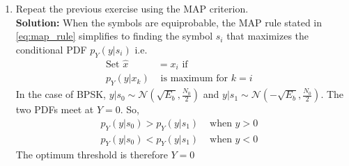 \documentclass[journal,10pt,twocolumn]{IEEEtran}
\newcommand{\solution}{\noindent \textbf{Solution: }}
\providecommand{\dec}[2]{\ensuremath{\overset{#1}{\underset{#2}{\gtrless}}}}
\providecommand{\gauss}[2]{\mathcal{N}\ensuremath{\left(#1,#2\right)}}
\begin{document}
\begin{enumerate}
\solution The decision rule is
\begin{equation}
y \dec{s_0}{s_1} 0
\end{equation}
\item
Repeat the previous exercise using the MAP criterion.\\
\solution When the symbols are equiprobable, the MAP rule stated in \eqref{eq:map_rule} simplifies to finding the symbol $s_i$ that %
maximizes the conditional PDF $p_Y(y|s_i)$ i.e.
\begin{align}
	\label{eq:mle_rule}
	\text{Set } \hat{x} &= x_i \text{ if}&\\ \nonumber
	p_Y(y|x_k) &\text{ is maximum for } k = i
\end{align}
In the case of BPSK, $y|s_0 \sim \gauss{\sqrt{E_b}}{\frac{N_0}{2}}$ and $y|s_1 \sim \gauss{-\sqrt{E_b}}{\frac{N_0}{2}}$. %
The two PDFs meet at $Y=0$. So,
\begin{align*}
	p_Y(y|s_0) > p_Y(y|s_1) &\text{ when } y > 0&\\
	p_Y(y|s_0) < p_Y(y|s_1) &\text{ when } y < 0 	
\end{align*}
The optimum threshold is therefore $Y=0$


\end{enumerate}
\end{document}

